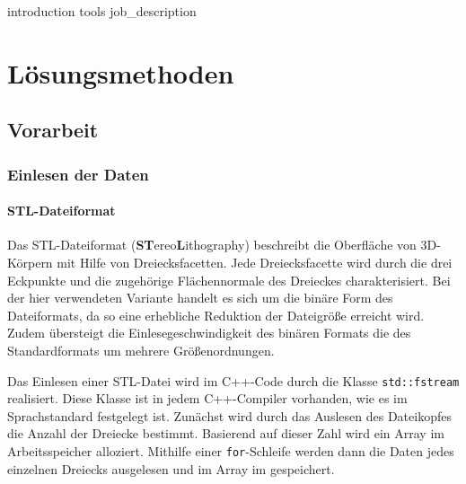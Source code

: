 \documentclass[crop=false]{standalone}
\begin{document}
  \tableofcontents
  \cleardoublepage

  {introduction}
  {tools}
  {job_description}

  \section{Lösungsmethoden} %
  \label{sec:loesungsmethoden}
    \subsection{Vorarbeit} %
    \label{sub:vorarbeit}

      \subsubsection{Einlesen der Daten} %
      \label{ssub:einlesen_der_daten}
        \paragraph{STL-Dateiformat}
        Das STL-Dateiformat (\textbf{ST}ereo\textbf{L}ithography) beschreibt die Oberfläche von 3D-Körpern mit Hilfe von Dreiecksfacetten.
        Jede Dreiecksfacette wird durch die drei Eckpunkte und die zugehörige Flächennormale des Dreieckes charakterisiert.
        Bei der hier verwendeten Variante handelt es sich um die binäre Form des Dateiformats, da so eine erhebliche Reduktion der Dateigröße erreicht wird.
        Zudem übersteigt die Einlesegeschwindigkeit des binären Formats die des Standardformats um mehrere Größenordnungen.

        Das Einlesen einer STL-Datei wird im C++-Code durch die Klasse \texttt{std::fstream} realisiert.
        Diese Klasse ist in jedem C++-Compiler vorhanden, wie es im Sprachstandard festgelegt ist.
        Zunächst wird durch das Auslesen des Dateikopfes die Anzahl der Dreiecke bestimmt.
        Basierend auf dieser Zahl wird ein Array im Arbeitsspeicher alloziert.
        Mithilfe einer \texttt{for}-Schleife werden dann die Daten jedes einzelnen Dreiecks ausgelesen und im Array im gespeichert.
\end{document}

